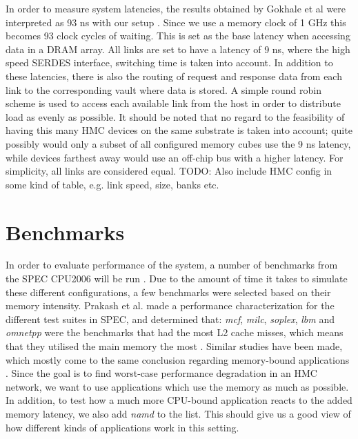 In order to measure system latencies, the results obtained by Gokhale et al were interpreted as 93 ns with our setup \cite{10.1145/2833179.2833184}. Since we use a memory clock of 1 GHz this becomes 93 clock cycles of waiting. This is set as the base latency when accessing data in a DRAM array. All links are set to have a latency of 9 ns, where the high speed SERDES interface, switching time is taken into account. In addition to these latencies, there is also the routing of request and response data from each link to the corresponding vault where data is stored. A simple round robin scheme is used to access each available link from the host in order to distribute load as evenly as possible. It should be noted that no regard to the feasibility of having this many HMC devices on the same substrate is taken into account; quite possibly would only a subset of all configured memory cubes use the 9 ns latency, while devices farthest away would use an off-chip bus with a higher latency. For simplicity, all links are considered equal.
TODO: Also include HMC config in some kind of table, e.g. link speed, size, banks etc.


\section{Benchmarks} \label{method-benches}
In order to evaluate performance of the system, a number of benchmarks from the SPEC CPU2006 will be run \cite{henning2006spec}. Due to the amount of time it takes to simulate these different configurations, a few benchmarks were selected based on their memory intensity. Prakash et al. made a performance characterization for the different test suites in SPEC, and determined that: \emph{mcf}, \emph{milc}, \emph{soplex}, \emph{lbm} and \emph{omnetpp} were the benchmarks that had the most L2 cache misses, which means that they utilised the main memory the most \cite{prakash2008performance}. Similar studies have been made, which mostly come to the same conclusion regarding memory-bound applications \cite{4664856, 4086140, bird2007performance}. Since the goal is to find worst-case performance degradation in an HMC network, we want to use applications which use the memory as much as possible. In addition, to test how a much more CPU-bound application reacts to the added memory latency, we also add \emph{namd} to the list. This should give us a good view of how different kinds of applications work in this setting. 
\bigskip

